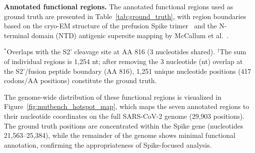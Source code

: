 \textbf{Annotated functional regions.}
The annotated functional regions used as ground truth are presented in Table~\ref{tab:ground_truth}, with region boundaries based on the cryo-EM structure of the prefusion Spike trimer~\cite{wrapp2020cryo} and the N-terminal domain (NTD) antigenic supersite mapping by McCallum et al.~\cite{mccallum2021ntd}.

\begin{table}[htbp]
\centering
\caption{Functional regions of the Spike protein (ground truth)}
\label{tab:ground_truth}
\begin{minipage}{\textwidth}
\smallskip
\footnotesize $^*$Overlaps with the S2' cleavage site at AA 816 (3 nucleotides shared).
$^\dagger$The sum of individual regions is 1,254 nt; after removing the 3 nucleotide (nt) overlap at the S2'/fusion peptide boundary (AA 816), 1,251 unique nucleotide positions (417 codons/AA positions) constitute the ground truth.
\end{minipage}
\end{table}

The genome-wide distribution of these functional regions is visualized in Figure~\ref{fig:mutbench_hotspot_map}, which maps the seven annotated regions to their nucleotide coordinates on the full SARS-CoV-2 genome (29,903 positions). The ground truth positions are concentrated within the Spike gene (nucleotides 21,563--25,384), while the remainder of the genome shows minimal functional annotation, confirming the appropriateness of Spike-focused analysis.

